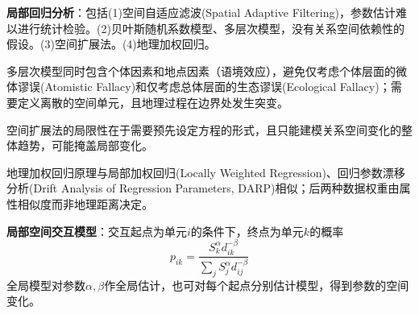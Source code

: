 \par \textbf{局部回归分析}：包括(1)空间自适应滤波(Spatial Adaptive Filtering)，参数估计难以进行统计检验。(2)贝叶斯随机系数模型、多层次模型，没有关系空间依赖性的假设。(3)空间扩展法。(4)地理加权回归。

\par 多层次模型同时包含个体因素和地点因素（语境效应），避免仅考虑个体层面的微体谬误(Atomistic Fallacy)和仅考虑总体层面的生态谬误(Ecological Fallacy)；需要定义离散的空间单元，且地理过程在边界处发生突变。

\par 空间扩展法的局限性在于需要预先设定方程的形式，且只能建模关系空间变化的整体趋势，可能掩盖局部变化。

\par 地理加权回归原理与局部加权回归(Locally Weighted Regression)、回归参数漂移分析(Drift Analysis of Regression Parameters, DARP)相似；后两种数据权重由属性相似度而非地理距离决定。

\par \textbf{局部空间交互模型}：交互起点为单元$i$的条件下，终点为单元$k$的概率
\begin{equation}
    p_{ik}=\frac{S_k^\alpha d_{ik}^{-\beta}}{\sum_j S_j^\alpha d_{ij}^{-\beta}}
\end{equation}
全局模型对参数$\alpha,\beta$作全局估计，也可对每个起点分别估计模型，得到参数的空间变化。
